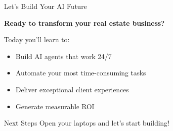 \documentclass{beamer}
\begin{document}
\begin{frame}{Let's Build Your AI Future}
  \begin{center}
    \Large
    \textbf{Ready to transform your real estate business?}
    
    \vspace{1cm}
    
    \normalsize
    Today you'll learn to:
    \begin{itemize}
      \item Build AI agents that work 24/7
      \item Automate your most time-consuming tasks
      \item Deliver exceptional client experiences
      \item Generate measurable ROI
    \end{itemize}
    
    \vspace{1cm}
    
    \begin{block}{Next Steps}
      Open your laptops and let's start building!
    \end{block}
  \end{center}
\end{frame}
\end{document}

